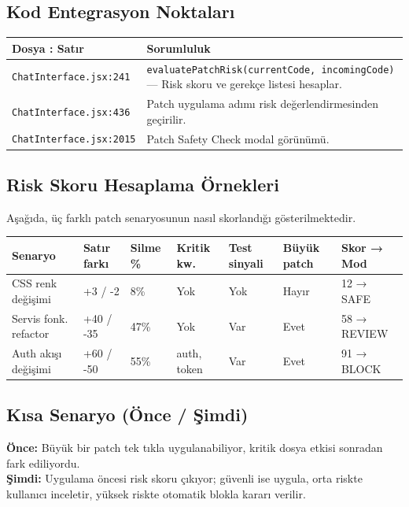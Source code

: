 \documentclass[11pt,a4paper]{article}
\begin{document}
\subsection{Kod Entegrasyon Noktaları}

\begin{tabularx}{\textwidth}{@{} L{4.5cm} X @{}}
\toprule
\textbf{Dosya : Satır} & \textbf{Sorumluluk} \\
\midrule
\texttt{ChatInterface.jsx:241} & \texttt{evaluatePatchRisk(currentCode, incomingCode)} — Risk skoru ve gerekçe listesi hesaplar. \\
\addlinespace
\texttt{ChatInterface.jsx:436} & Patch uygulama adımı risk değerlendirmesinden geçirilir. \\
\addlinespace
\texttt{ChatInterface.jsx:2015} & Patch Safety Check modal görünümü. \\
\bottomrule
\end{tabularx}

\subsection{Risk Skoru Hesaplama Örnekleri}

Aşağıda, üç farklı patch senaryosunun nasıl skorlandığı gösterilmektedir.

\small
\begin{tabularx}{\textwidth}{@{} L{2.8cm} L{1.5cm} L{1.3cm} L{1.5cm} L{1.8cm} L{1.6cm} L{2cm} @{}}
\toprule
\textbf{Senaryo} & \textbf{Satır farkı} & \textbf{Silme \%} & \textbf{Kritik kw.} & \textbf{Test sinyali} & \textbf{Büyük patch} & \textbf{Skor → Mod} \\
\midrule
CSS renk değişimi & +3 / -2 & 8\% & Yok & Yok & Hayır & 12 → SAFE \\
\addlinespace
Servis fonk. refactor & +40 / -35 & 47\% & Yok & Var & Evet & 58 → REVIEW \\
\addlinespace
Auth akışı değişimi & +60 / -50 & 55\% & auth, token & Var & Evet & 91 → BLOCK \\
\bottomrule
\end{tabularx}
\normalsize

\subsection{Kısa Senaryo (Önce / Şimdi)}

\begin{notebox}
\textbf{Önce:} Büyük bir patch tek tıkla uygulanabiliyor, kritik dosya etkisi sonradan fark ediliyordu.\\[4pt]
\textbf{Şimdi:} Uygulama öncesi risk skoru çıkıyor; güvenli ise uygula, orta riskte kullanıcı inceletir, yüksek riskte otomatik blokla kararı verilir.
\end{notebox}
\end{document}
